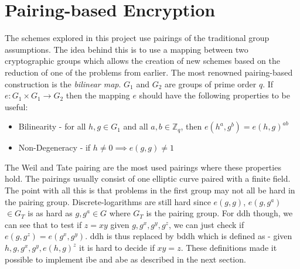 \section{Pairing-based Encryption}\label{parings}
 The schemes explored in this project use pairings \cite{pairing-survey} of the traditional group assumptions. The idea behind this is to use a mapping between two cryptographic groups which allows the creation of new schemes based on the reduction of one of the problems from earlier. The most renowned pairing-based construction is the \emph{bilinear map}. $G_1$ and $G_2$ are groups of prime order $q$. If $e: G_1 \times G_1 \rightarrow G_2$ then the mapping $e$ should have the following properties to be useful: 
\begin{itemize}
\item Bilinearity - for all $h, g \in G_1$ and all $a,b \in \mathbb{Z}_q$, then $e(h^a, g^b) = e(h, g)^{ab}$
\item Non-Degeneracy - if $h \neq 0 \implies e(g,g) \neq 1$
\end{itemize}
The Weil and Tate pairing are the most used pairings where these properties hold. The pairings usually consist of one elliptic curve paired with a finite field. 
The point with all this is that problems in the first group may not all be hard in the pairing group. Discrete-logarithms are still hard since $e(g,g)$, $e(g,g^a)$ $\in G_T$ is as hard as $g,g^a \in G$ where $G_T$ is the pairing group.
For \gls{ddh} though, we can see that to test if $z=xy$ given $g, g^x, g^y, g^z$, we can just check if $e(g, g^z) = e(g^x, g^y)$. \Gls{ddh} is thus replaced by \gls{bddh} which is defined as - given $h, g, g^x, g^y, e(h,g)^z$ it is hard to decide if $xy = z$. These definitions made it possible to implement \gls{ibe} and \gls{abe} as described in the next section.

